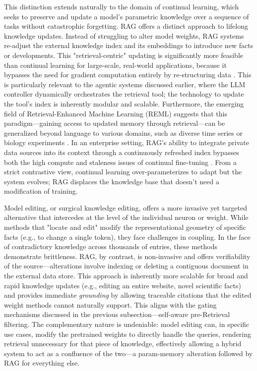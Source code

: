 \documentclass[11pt,a4paper]{article}
\begin{document}
This distinction extends naturally to the domain of continual learning, which seeks to preserve and update a model's parametric knowledge over a sequence of tasks without catastrophic forgetting. RAG offers a distinct approach to lifelong knowledge updates. Instead of struggling to alter model weights, RAG systems re-adjust the external knowledge index and its embeddings to introduce new facts or developments. This "retrieval-centric" updating is significantly more feasible than continual learning for large-scale, real-world applications, because it bypasses the need for gradient computation entirely by re-structuring data \cite{arxiv:2312.10997v5}. This is particularly relevant to the agentic systems discussed earlier, where the LLM controller dynamically orchestrates the retrieval tool; the technology to update the tool's index is inherently modular and scalable. Furthermore, the emerging field of Retrieval-Enhanced Machine Learning (REML) suggests that this paradigm---gaining access to updated memory through retrieval---can be generalized beyond language to various domains, such as diverse time series or biology experiments \cite{arxiv:2407.12982v1}. In an enterprise setting, RAG's ability to integrate private data sources into its context through a continuously refreshed index bypasses both the high compute and staleness issues of continual fine-tuning \cite{arxiv:2404.17723v2,arxiv:2402.07483v1}. From a strict contrastive view, continual learning over-parameterizes to adapt but the system evolves; RAG displaces the knowledge base that doesn't need a modification of training.

Model editing, or surgical knowledge editing, offers a more invasive yet targeted alternative that intercedes at the level of the individual neuron or weight. While methods that "locate and edit" modify the representational geometry of specific facts (e.g., to change a single token), they face challenges in coupling. In the face of contradictory knowledge across thousands of entries, these methods demonstrate brittleness. RAG, by contrast, is non-invasive and offers verifiability of the source---alterations involve indexing or deleting a contiguous document in the external data store. This approach is inherently more scalable for broad and rapid knowledge updates (e.g., editing an entire website, novel scientific facts) and provides immediate \emph{grounding} by allowing traceable citations that the edited weight methods cannot naturally support. This aligns with the gating mechanisms discussed in the previous subsection---self-aware pre-Retrieval filtering. The complementary nature is undeniable: model editing can, in specific use cases, modify the pretrained weights to directly handle the queries, rendering retrieval unnecessary for that piece of knowledge, effectively allowing a hybrid system to act as a confluence of the two---a param-memory alteration followed by RAG for everything else.
\end{document}
